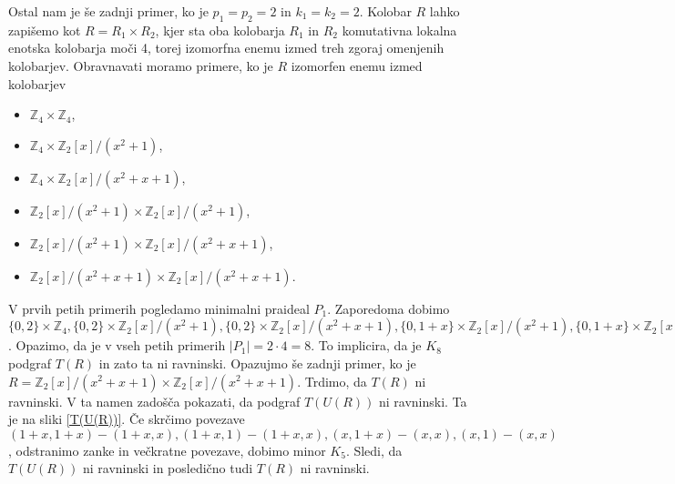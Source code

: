 \documentclass[a4paper, 12pt]{amsart}
\theoremstyle{definition} %
\theoremstyle{plain} %
\newcommand{\Z}{\mathbb Z}
\begin{document}
\begin{enumerate}
Ostal nam je še zadnji primer, ko je $p_1 = p_2 = 2$ in $k_1 = k_2 = 2$. Kolobar $R$ lahko zapišemo kot $R=R_1 \times R_2$, kjer sta oba kolobarja $R_1$ in $R_2$ komutativna lokalna enotska kolobarja moči 4, torej izomorfna enemu izmed treh zgoraj omenjenih kolobarjev. Obravnavati moramo primere, ko je $R$ izomorfen enemu izmed kolobarjev
\begin{itemize}
\item $\Z_4 \times \Z_4$,
\item $\Z_4 \times \Z_2[x]/(x^2 + 1)$,
\item $\Z_4 \times \Z_2[x] / (x^2 + x+ 1)$,
\item $\Z_2[x]/(x^2+1) \times \Z_2[x]/(x^2+1)$,
\item $\Z_2[x]/(x^2+1) \times \Z_2[x]/(x^2 + x+ 1)$,
\item $\Z_2[x]/(x^2 + x + 1) \times \Z_2[x] / (x^2+x+1)$.
\end{itemize}

V prvih petih primerih pogledamo minimalni praideal $P_1$. Zaporedoma dobimo $\{0,2\} \times \Z_4, \{0,2\}\times \Z_2[x]/(x^2 + 1), \{0,2\} \times \Z_2[x]/(x^2 + x+1), \{0,1+x\} \times \Z_2[x]/(x^2 + 1), \{0,1+x\} \times \Z_2[x]/(x^2 + x+1)$. Opazimo, da je v vseh petih primerih $|P_1| = 2\cdot 4 = 8$. To implicira, da je $K_8$ podgraf $T(R)$ in zato ta ni ravninski. 
Opazujmo še zadnji primer, ko je  $R = \Z_2[x]/(x^2 + x + 1) \times \Z_2[x] / (x^2+x+1)$. Trdimo, da $T(R)$ ni ravninski. V ta namen zadošča pokazati, da podgraf $T(U(R))$ ni ravninski. Ta je na sliki \ref{T(U(R))}. Če skrčimo povezave $(1+x,1+x)-(1+x,x), (1+x,1)-(1+x,x), (x,1+x)-(x,x), (x,1)-(x,x)$, odstranimo zanke in večkratne povezave, dobimo minor $K_5$. Sledi, da $T(U(R))$ ni ravninski in posledično tudi $T(R)$ ni ravninski. 

\begin{figure}[h!]
\centering
\end{figure}
\end{enumerate}
\end{document}
